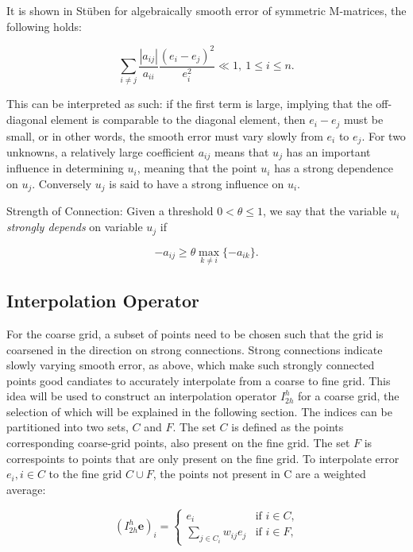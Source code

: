 It is shown in Stüben for algebraically smooth error of symmetric M-matrices, the following holds:

\begin{equation}
	\sum_{i \neq j}{\frac{|a_{ij}|}{a_{ii}}\frac{(e_i - e_j)^2}{e_i^2}} \ll 1,\ 1 \leq i \leq n.
	\label{eq:strong_connection}
\end{equation}

This can be interpreted as such: if the first term is large, implying that the off-diagonal element is comparable to the diagonal element, then $e_i - e_j$ must be small, or in other words, the smooth error must vary slowly from $e_i$ to $e_j$. For two unknowns, a relatively large coefficient $a_{ij}$ means that $u_j$ has an important influence in determining $u_i$, meaning that the point $u_i$ has a strong dependence on $u_j$. Conversely $u_j$ is said to have a strong influence on $u_i$.

Strength of Connection: Given a threshold $0 < \theta \leq 1$, we say that the variable $u_i$ \emph{strongly depends} on variable $u_j$ if

\begin{equation}
-a_{ij} \geq \theta \max_{k \neq i}{\{-a_{ik}\}}.
\label{eq:strong_connection2}
\end{equation}


\subsection{Interpolation Operator} %

For the coarse grid, a subset of points need to be chosen such that the grid is coarsened in the direction on strong connections. Strong connections indicate slowly varying smooth error, as above, which make such strongly connected points good candiates to accurately interpolate from a coarse to fine grid. This idea will be used to construct an interpolation operator $I_{2h}^h$ for a coarse grid, the selection of which will be explained in the following section. The indices can be partitioned into two sets, $C$ and $F$. The set $C$ is defined as the points corresponding coarse-grid points, also present on the fine grid. The set $F$ is correspoints to points that are only present on the fine grid. To interpolate error $e_i, i \in C$ to the fine grid $C \cup F$, the points not present in C are a weighted average:

\begin{equation}
	(I_{2h}^h\mathbf{e})_i =
		\begin{cases}
			e_i & \text{if $i \in C$,} \\
			\displaystyle \sum_{j \in C_i}{w_{ij}e_j} & \text{if $i \in F$,}
		\end{cases}
	\label{eq:interpolation_operator}
\end{equation}

